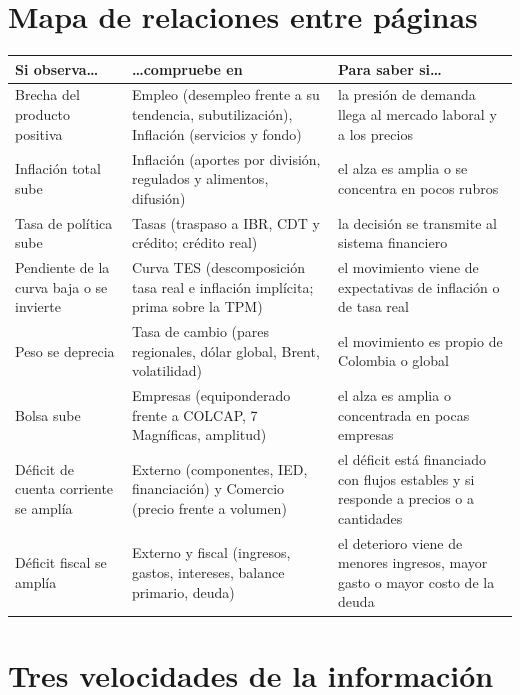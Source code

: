 \section{Mapa de relaciones entre páginas}

\begin{center}
\small
\begin{tabularx}{\linewidth}{>{\raggedright\arraybackslash}p{3.3cm}>{\raggedright\arraybackslash}X>{\raggedright\arraybackslash}p{3.6cm}}
\toprule
\textbf{Si observa\ldots} & \textbf{\ldots compruebe en} & \textbf{Para saber si\ldots}\\
\midrule
Brecha del producto positiva & Empleo (desempleo frente a su tendencia, subutilización), Inflación (servicios y fondo) &
la presión de demanda llega al mercado laboral y a los precios\\
Inflación total sube & Inflación (aportes por división, regulados y alimentos, difusión) & el alza es amplia o se
concentra en pocos rubros\\
Tasa de política sube & Tasas (traspaso a IBR, CDT y crédito; crédito real) & la decisión se transmite al sistema
financiero\\
Pendiente de la curva baja o se invierte & Curva TES (descomposición tasa real e inflación implícita; prima sobre
la TPM) & el movimiento viene de expectativas de inflación o de tasa real\\
Peso se deprecia & Tasa de cambio (pares regionales, dólar global, Brent, volatilidad) & el movimiento es propio de
Colombia o global\\
Bolsa sube & Empresas (equiponderado frente a COLCAP, 7 Magníficas, amplitud) & el alza es amplia o concentrada en
pocas empresas\\
Déficit de cuenta corriente se amplía & Externo (componentes, IED, financiación) y Comercio (precio frente a
volumen) & el déficit está financiado con flujos estables y si responde a precios o a cantidades\\
Déficit fiscal se amplía & Externo y fiscal (ingresos, gastos, intereses, balance primario, deuda) & el deterioro
viene de menores ingresos, mayor gasto o mayor costo de la deuda\\
\bottomrule
\end{tabularx}
\end{center}

\section{Tres velocidades de la información}

